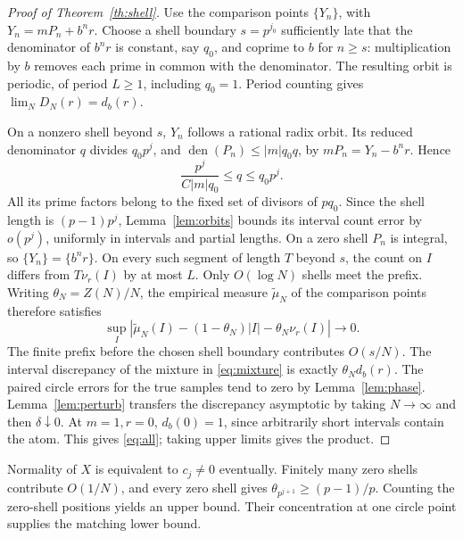 \documentclass[11pt]{article}
\newcommand{\den}{\operatorname{den}}
\newcommand{\fr}[1]{\{#1\}}
\begin{document}
\begin{proof}[Proof of Theorem~\ref{th:shell}]
Use the comparison points \(\fr{Y_n}\), with \(Y_n=mP_n+b^n r\). Choose a shell boundary \(s=p^{j_0}\) sufficiently late that the denominator of \(b^n r\) is constant, say \(q_0\), and coprime to \(b\) for \(n\ge s\): multiplication by \(b\) removes each prime in common with the denominator. The resulting orbit is periodic, of period \(L\ge1\), including \(q_0=1\). Period counting gives \(\lim_N D_N(r)=d_b(r)\).

On a nonzero shell beyond \(s\), \(Y_n\) follows a rational radix orbit. Its reduced denominator \(q\) divides \(q_0p^j\), and \(\den(P_n)\le |m|q_0q\), by \(mP_n=Y_n-b^nr\). Hence
\[
 \frac{p^j}{C|m|q_0}\le q\le q_0p^j .
\]
All its prime factors belong to the fixed set of divisors of \(pq_0\). Since the shell length is \((p-1)p^j\), Lemma~\ref{lem:orbits} bounds its interval count error by \(o(p^j)\), uniformly in intervals and partial lengths. On a zero shell \(P_n\) is integral, so \(\fr{Y_n}=\fr{b^nr}\). On every such segment of length \(T\) beyond \(s\), the count on \(I\) differs from \(T\nu_r(I)\) by at most \(L\). Only \(O(\log N)\) shells meet the prefix. Writing \(\theta_N=Z(N)/N\), the empirical measure \(\widetilde\mu_N\) of the comparison points therefore satisfies
\begin{equation}\label{eq:mixture}
 \sup_I\left|\widetilde\mu_N(I)-(1-\theta_N)|I|-\theta_N\nu_r(I)\right|\longrightarrow0 .
\end{equation}
The finite prefix before the chosen shell boundary contributes \(O(s/N)\). The interval discrepancy of the mixture in \eqref{eq:mixture} is exactly \(\theta_Nd_b(r)\). The paired circle errors for the true samples tend to zero by Lemma~\ref{lem:phase}. Lemma~\ref{lem:perturb} transfers the discrepancy asymptotic by taking \(N\to\infty\) and then \(\delta\downarrow0\). At \(m=1,r=0\), \(d_b(0)=1\), since arbitrarily short intervals contain the atom. This gives \eqref{eq:all}; taking upper limits gives the product.
\end{proof}

Normality of \(X\) is equivalent to \(c_j\ne0\) eventually. Finitely many zero shells contribute \(O(1/N)\), and every zero shell gives \(\theta_{p^{j+1}}\ge(p-1)/p\). Counting the zero-shell positions yields an upper bound. Their concentration at one circle point supplies the matching lower bound.
\end{document}
